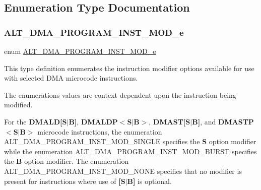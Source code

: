 \subsection{Enumeration Type Documentation}
\mbox{\label{group__ALT__DMA__PRG_ga6b384475142e2b8bedeb93223c460229}} 
\subsubsection{\texorpdfstring{ALT\_DMA\_PROGRAM\_INST\_MOD\_e}{ALT\_DMA\_PROGRAM\_INST\_MOD\_e}}
{\footnotesize\ttfamily enum \mbox{\hyperlink{group__ALT__DMA__PRG_ga6b384475142e2b8bedeb93223c460229}{A\+L\+T\+\_\+\+D\+M\+A\+\_\+\+P\+R\+O\+G\+R\+A\+M\+\_\+\+I\+N\+S\+T\+\_\+\+M\+O\+D\+\_\+e}}}

This type definition enumerates the instruction modifier options available for use with selected D\+MA microcode instructions.

The enumerations values are context dependent upon the instruction being modified.

For the {\bfseries{D\+M\+A\+LD\mbox{[}S$\vert$B\mbox{]}}}, {\bfseries{D\+M\+A\+L\+DP$<$S$\vert$B$>$}}, {\bfseries{D\+M\+A\+ST\mbox{[}S$\vert$B\mbox{]}}}, and {\bfseries{D\+M\+A\+S\+TP$<$S$\vert$B$>$}} microcode instructions, the enumeration A\+L\+T\+\_\+\+D\+M\+A\+\_\+\+P\+R\+O\+G\+R\+A\+M\+\_\+\+I\+N\+S\+T\+\_\+\+M\+O\+D\+\_\+\+S\+I\+N\+G\+LE specifies the {\bfseries{S}} option modifier while the enumeration A\+L\+T\+\_\+\+D\+M\+A\+\_\+\+P\+R\+O\+G\+R\+A\+M\+\_\+\+I\+N\+S\+T\+\_\+\+M\+O\+D\+\_\+\+B\+U\+R\+ST specifies the {\bfseries{B}} option modifier. The enumeration A\+L\+T\+\_\+\+D\+M\+A\+\_\+\+P\+R\+O\+G\+R\+A\+M\+\_\+\+I\+N\+S\+T\+\_\+\+M\+O\+D\+\_\+\+N\+O\+NE specifies that no modifier is present for instructions where use of {\bfseries{\mbox{[}S$\vert$B\mbox{]}}} is optional.

